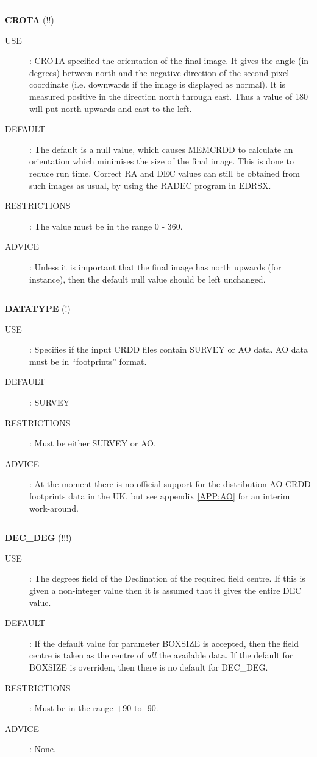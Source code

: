 \rule{\textwidth}{0.3mm}
{\Large {\bf CROTA} (!!)}
\begin{description}
\item [USE]:
CROTA specified the orientation of the final image. It gives the angle (in
degrees) between north and the negative direction of the second pixel
coordinate (i.e. downwards if the image is displayed as normal). It is
measured positive in the direction north through east. Thus a value of 180
will put north upwards and east to the left.
\item [DEFAULT]:
The default is a null value, which causes MEMCRDD to calculate an orientation
which minimises the size of the final image. This is done to reduce run time.
Correct RA and DEC values can still be obtained from such images as usual, by
using the RADEC program in EDRSX.
\item [RESTRICTIONS]:
The value must be in the range 0 - 360.
\item [ADVICE]:
Unless it is important that the final image has north upwards (for instance),
then the default null value should be left unchanged.
\end {description}


\rule{\textwidth}{0.3mm}
{\Large {\bf DATATYPE} (!)}
\begin{description}
\item [USE]:
Specifies if the input CRDD files contain SURVEY or AO data. AO data must be in
``footprints'' format.
\item [DEFAULT]:
SURVEY
\item [RESTRICTIONS]:
Must be either SURVEY or AO.
\item [ADVICE]:
At the moment there is no official support for the distribution AO CRDD
footprints data in the UK, but see appendix \ref{APP:AO} for an interim
work-around.
\end {description}

\rule{\textwidth}{0.3mm}
{\Large {\bf DEC\_DEG} (!!!)}
\begin{description}
\item [USE]:
The degrees field of the Declination of the required field centre. If this
is given a non-integer value then it is assumed that it gives the entire DEC
value.
\item [DEFAULT]:
If the default value for parameter BOXSIZE is accepted, then the field centre
is taken as the centre of {\em all} the available data. If the default for
BOXSIZE is overriden, then there is no default for DEC\_DEG.
\item [RESTRICTIONS]:
Must be in the range +90 to -90.
\item [ADVICE]:
None.
\end {description}

